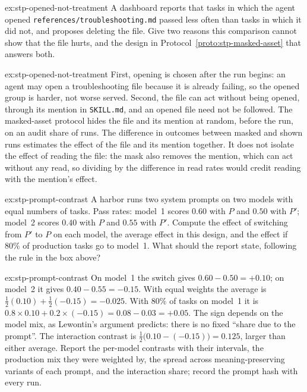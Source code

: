 
\begin{pdexercise}[kind=Check,rating=1]{ex:stp-opened-not-treatment}
A dashboard reports that tasks in which the agent opened
\texttt{references/troubleshooting.md} passed less often than tasks in which
it did not, and proposes deleting the file. Give two reasons this comparison
cannot show that the file hurts, and the design in
Protocol~\ref{proto:stp-masked-asset} that answers both.
\end{pdexercise}
\begin{pdsolution}{ex:stp-opened-not-treatment}
First, opening is chosen after the run begins: an agent may open a
troubleshooting file because it is already failing, so the opened group is
harder, not worse served. Second, the file can act without being opened,
through its mention in \texttt{SKILL.md}, and an opened file need not be
followed. The masked-asset protocol hides the file and its mention at random,
before the run, on an audit share of runs. The difference in outcomes between
masked and shown runs estimates the effect of the file and its mention
together. It does not isolate the effect of reading the file: the mask also
removes the mention, which can act without any read, so dividing by the
difference in read rates would credit reading with the mention's effect.
\end{pdsolution}
\begin{pdexercise}[kind=Trace,rating=2]{ex:stp-prompt-contrast}
A harbor runs two system prompts on two models with equal numbers of tasks.
Pass rates: model~1 scores $0.60$ with $P$ and $0.50$ with $P'$;
model~2 scores $0.40$ with $P$ and $0.55$ with $P'$. Compute the effect of
switching from $P'$ to $P$ on each model, the average effect in this design,
and the effect if $80\%$ of production tasks go to model~1. What should the
report state, following the rule in the box above?
\end{pdexercise}
\begin{pdsolution}{ex:stp-prompt-contrast}
On model~1 the switch gives $0.60-0.50=+0.10$; on model~2 it gives
$0.40-0.55=-0.15$. With equal weights the average is
$\tfrac12(0.10)+\tfrac12(-0.15)=-0.025$. With $80\%$ of tasks on model~1 it is
$0.8\times0.10+0.2\times(-0.15)=0.08-0.03=+0.05$. The sign depends on the
model mix, as Lewontin's argument predicts: there is no fixed ``share due to
the prompt''. The interaction contrast is
$\tfrac12\bigl(0.10-(-0.15)\bigr)=0.125$, larger than either average. Report
the per-model contrasts with their intervals, the production mix they were
weighted by, the spread across meaning-preserving variants of each prompt,
and the interaction share; record the prompt hash with every run.
\end{pdsolution}
